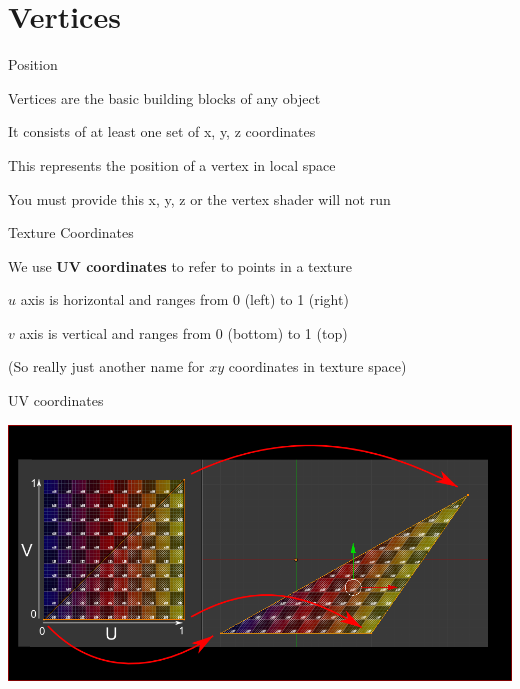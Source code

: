 \part{Vertices}
\frame{\partpage}

\begin{frame}{Position}
	\item Vertices are the basic building blocks of any object
	\pause\item It consists of at least one set of x, y, z coordinates
	\pause\item This represents the position of a vertex in local space
	\pause\item You must provide this x, y, z or the vertex shader will not run
\end{frame}

\begin{frame}{Texture Coordinates}
	\item We use \textbf{UV coordinates} to refer to points in a texture
	\pause\item $u$ axis is horizontal and ranges from 0 (left) to 1 (right)
	\pause\item $v$ axis is vertical and ranges from 0 (bottom) to 1 (top)
	\pause\item (So really just another name for $xy$ coordinates in texture space)
\end{frame}

\begin{frame}{UV coordinates}
\begin{center}
	\includegraphics[width=\textwidth]{uv}
\end{center}
\end{frame}